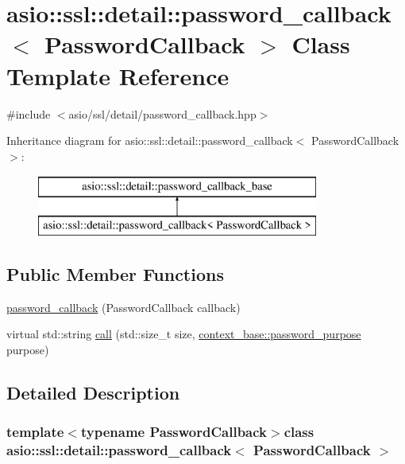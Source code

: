 \hypertarget{classasio_1_1ssl_1_1detail_1_1password__callback}{}\section{asio\+:\+:ssl\+:\+:detail\+:\+:password\+\_\+callback$<$ Password\+Callback $>$ Class Template Reference}
\label{classasio_1_1ssl_1_1detail_1_1password__callback}


{\ttfamily \#include $<$asio/ssl/detail/password\+\_\+callback.\+hpp$>$}

Inheritance diagram for asio\+:\+:ssl\+:\+:detail\+:\+:password\+\_\+callback$<$ Password\+Callback $>$\+:\begin{figure}[H]
\begin{center}
\leavevmode
\includegraphics[height=2.000000cm]{classasio_1_1ssl_1_1detail_1_1password__callback}
\end{center}
\end{figure}
\subsection*{Public Member Functions}
\begin{DoxyCompactItemize}
\item 
\hyperlink{classasio_1_1ssl_1_1detail_1_1password__callback_a694d95318c25f1483f4567b43bf4577b}{password\+\_\+callback} (Password\+Callback callback)
\item 
virtual std\+::string \hyperlink{classasio_1_1ssl_1_1detail_1_1password__callback_ae832e50c50f08d00646b22e744006276}{call} (std\+::size\+\_\+t size, \hyperlink{classasio_1_1ssl_1_1context__base_a0e5aec1cd0f3db28becde1dca686c855}{context\+\_\+base\+::password\+\_\+purpose} purpose)
\end{DoxyCompactItemize}


\subsection{Detailed Description}
\subsubsection*{template$<$typename Password\+Callback$>$class asio\+::ssl\+::detail\+::password\+\_\+callback$<$ Password\+Callback $>$}



